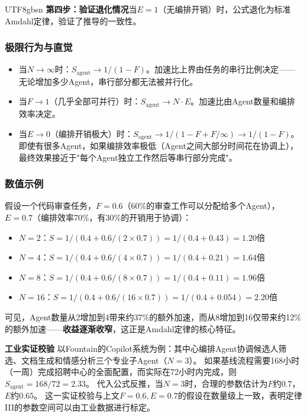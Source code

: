 \documentclass[11pt,a4paper]{article}
\begin{document}
\begin{CJK*}{UTF8}{gbsn}
\textbf{第四步：验证退化情况}当$E = 1$（无编排开销）时，公式退化为标准Amdahl定律，验证了推导的一致性。

\subsubsection{极限行为与直觉}

\begin{itemize}[nosep]
\item 当$N \to \infty$时：$S_{\mathrm{agent}} \to 1/(1-F)$。加速比上界由任务的串行比例决定——无论增加多少Agent，串行部分都无法被并行化。
\item 当$F \to 1$（几乎全部可并行）时：$S_{\mathrm{agent}} \to N \cdot E$。加速比由Agent数量和编排效率决定。
\item 当$E \to 0$（编排开销极大）时：$S_{\mathrm{agent}} \to 1/(1-F+F/\infty) \to 1/(1-F)$。即使有很多Agent，如果编排效率极低（Agent之间大部分时间花在协调上），最终效果接近于"每个Agent独立工作然后等串行部分完成"。
\end{itemize}

\subsubsection{数值示例}

假设一个代码审查任务，$F = 0.6$（60\%的审查工作可以分配给多个Agent），$E = 0.7$（编排效率70\%，有30\%的开销用于协调）：

\begin{itemize}[nosep]
\item $N = 2$：$S = 1/(0.4 + 0.6/(2 \times 0.7)) = 1/(0.4 + 0.43) = 1.20$倍
\item $N = 4$：$S = 1/(0.4 + 0.6/(4 \times 0.7)) = 1/(0.4 + 0.21) = 1.64$倍
\item $N = 8$：$S = 1/(0.4 + 0.6/(8 \times 0.7)) = 1/(0.4 + 0.11) = 1.96$倍
\item $N = 16$：$S = 1/(0.4 + 0.6/(16 \times 0.7)) = 1/(0.4 + 0.054) = 2.20$倍
\end{itemize}

可见，Agent数量从2增加到4带来约37\%的额外加速，而从8增加到16仅带来约12\%的额外加速——\textbf{收益逐渐收窄}，这正是Amdahl定律的核心特征。

\textbf{工业实证校验}
以Fountain的Copilot系统为例\cite{anthropic2026agenticreport}：其中心编排Agent协调候选人筛选、文档生成和情感分析三个专业子Agent（$N=3$）。
如果基线流程需要168小时（一周）完成招聘中心的全面配置，而实际在72小时内完成，则$S_{\mathrm{agent}} = 168/72 = 2.33$。
代入公式反推，当$N=3$时，合理的参数估计为$F$约$0.7$，$E$约$0.65$。
这一实证校验与上文$F=0.6, E=0.7$的假设在数量级上一致，表明定律III的参数空间可以由工业数据进行标定。


\end{CJK*}
\end{document}
